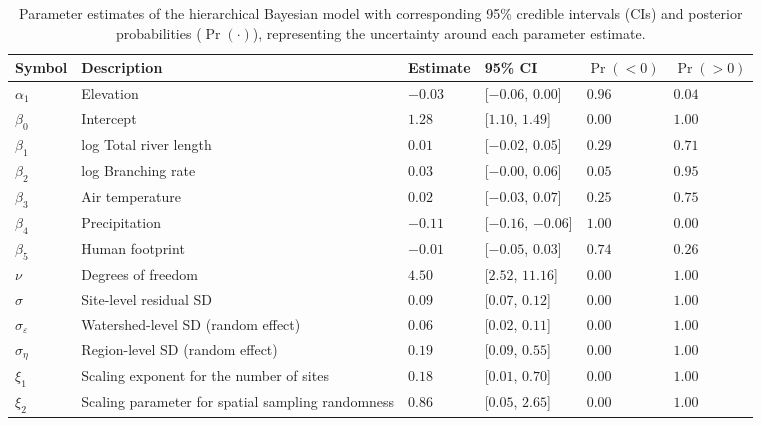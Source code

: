 \begin{table}[ht]
\centering
\caption{Parameter estimates of the hierarchical Bayesian model 
             with corresponding 95\% credible intervals (CIs) and 
             posterior probabilities ($\Pr(\cdot)$), 
             representing the uncertainty around each parameter estimate.
             \label{tab:parms-est}} 
\begingroup\small
\begin{tabularx}{\textwidth}{llllll}
  \hline
Symbol & Description & Estimate & 95\% CI & $\Pr(< 0)$ & $\Pr(> 0)$ \\ 
  \hline
$\alpha_1$ & Elevation & $-0.03$ & [$-0.06$, $0.00$] & $0.96$ & $0.04$ \\ 
  $\beta_0$ & Intercept & $1.28$ & [$1.10$, $1.49$] & $0.00$ & $1.00$ \\ 
  $\beta_1$ & log Total river length & $0.01$ & [$-0.02$, $0.05$] & $0.29$ & $0.71$ \\ 
  $\beta_2$ & log Branching rate & $0.03$ & [$-0.00$, $0.06$] & $0.05$ & $0.95$ \\ 
  $\beta_3$ & Air temperature & $0.02$ & [$-0.03$, $0.07$] & $0.25$ & $0.75$ \\ 
  $\beta_4$ & Precipitation & $-0.11$ & [$-0.16$, $-0.06$] & $1.00$ & $0.00$ \\ 
  $\beta_5$ & Human footprint & $-0.01$ & [$-0.05$, $0.03$] & $0.74$ & $0.26$ \\ 
  $\nu$ & Degrees of freedom & $4.50$ & [$2.52$, $11.16$] & $0.00$ & $1.00$ \\ 
  $\sigma$ & Site-level residual SD & $0.09$ & [$0.07$, $0.12$] & $0.00$ & $1.00$ \\ 
  $\sigma_{\varepsilon}$ & Watershed-level SD (random effect) & $0.06$ & [$0.02$, $0.11$] & $0.00$ & $1.00$ \\ 
  $\sigma_{\eta}$ & Region-level SD (random effect) & $0.19$ & [$0.09$, $0.55$] & $0.00$ & $1.00$ \\ 
  $\xi_{1}$ & Scaling exponent for the number of sites & $0.18$ & [$0.01$, $0.70$] & $0.00$ & $1.00$ \\ 
  $\xi_{2}$ & Scaling parameter for spatial sampling randomness & $0.86$ & [$0.05$, $2.65$] & $0.00$ & $1.00$ \\ 
   \hline
\end{tabularx}
\endgroup
\end{table}
